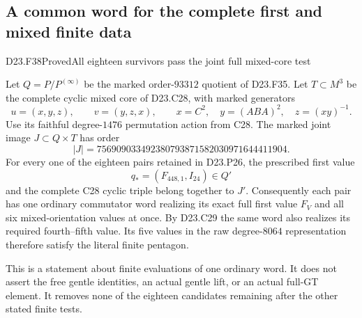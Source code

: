 \subsection{A common word for the complete first and mixed finite data}

\begin{statement}{D23.F38}{Proved}{All eighteen survivors pass the joint full mixed-core test}
\end{statement}
Let $Q=P/P^{(\infty)}$ be the marked order-$93312$ quotient
of D23.F35. Let $T\subset M^3$ be the complete cyclic mixed core
of D23.C28, with marked generators
\[
                  u=(x,y,z),\qquad v=(y,z,x),
          \qquad x=C^2,\quad y=(ABA)^2,\quad z=(xy)^{-1}.
\]
Use its faithful degree-$1476$ permutation action from C28.
The marked joint image $J\subset Q\times T$ has order
\[
                  |J|=756909033492380793871582030971644411904.
\]
For every one of the eighteen pairs retained in D23.P26, the
prescribed first value
\[
                  q_*=(F_{448,1},I_{24})\in Q'
\]
and the complete C28 cyclic triple belong together to $J'$.
Consequently each pair has one ordinary commutator word realizing
its exact full first value $F_V$ and all six mixed-orientation
values at once. By D23.C29 the same word also realizes its required
fourth--fifth value. Its five values in the raw degree-$8064$
representation therefore satisfy the literal finite pentagon.

This is a statement about finite evaluations of one ordinary word.
It does not assert the free gentle identities, an actual gentle
lift, or an actual full-GT element. It removes none of the eighteen
candidates remaining after the other stated finite tests.


